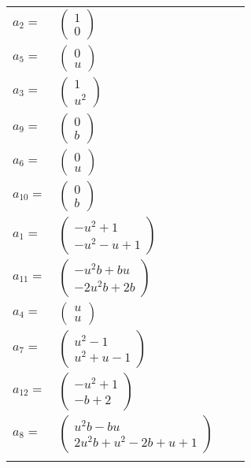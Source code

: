 \documentclass[1p]{elsarticle_modified}
\theoremstyle{definition}
\begin{document}
\begin{tabular}{m{7pt} m{180pt} m{7pt} m{180pt} }
\flushright $a_{2}=$&$\begin{pmatrix}1\\0\end{pmatrix}$ \\
\flushright $a_{5}=$&$\begin{pmatrix}0\\u\end{pmatrix}$ \\
\flushright $a_{3}=$&$\begin{pmatrix}1\\u^2\end{pmatrix}$ \\
\flushright $a_{9}=$&$\begin{pmatrix}0\\b\end{pmatrix}$ \\
\flushright $a_{6}=$&$\begin{pmatrix}0\\u\end{pmatrix}$ \\
\flushright $a_{10}=$&$\begin{pmatrix}0\\b\end{pmatrix}$ \\
\flushright $a_{1}=$&$\begin{pmatrix}- u^2+1\\- u^2- u+1\end{pmatrix}$ \\
\flushright $a_{11}=$&$\begin{pmatrix}- u^2 b+b u\\-2 u^2 b+2 b\end{pmatrix}$ \\
\flushright $a_{4}=$&$\begin{pmatrix}u\\u\end{pmatrix}$ \\
\flushright $a_{7}=$&$\begin{pmatrix}u^2-1\\u^2+u-1\end{pmatrix}$ \\
\flushright $a_{12}=$&$\begin{pmatrix}- u^2+1\\- b+2\end{pmatrix}$ \\
\flushright $a_{8}=$&$\begin{pmatrix}u^2 b- b u\\2 u^2 b+u^2-2 b+u+1\end{pmatrix}$\\&\end{tabular}
\end{document}
